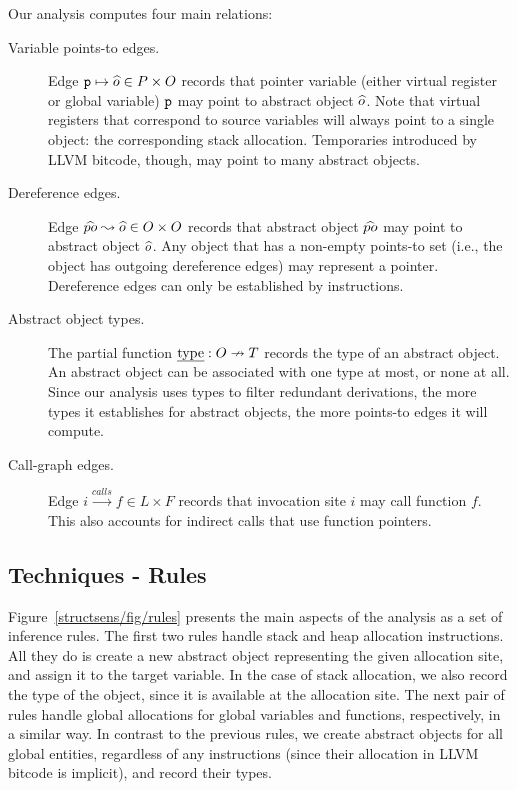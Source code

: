 \vspace{0.5em}
\noindent
Our analysis computes four main
relations:
\begin{description}
\item[Variable points-to edges.] Edge $\texttt{p} \mapsto \widehat{o} \in P \times O$
  records that pointer variable (either virtual register or global
  variable) $\texttt{p}$ may point to abstract object $\widehat{o}$. Note
  that virtual registers that correspond to source variables will
  always point to a single object: the corresponding stack
  allocation. Temporaries introduced by LLVM bitcode, though, may
  point to many abstract objects.
\item[Dereference edges.] Edge $\widehat{po} \leadsto \widehat{o} \in O \times O$
  records that abstract object $\widehat{po}$ may point to abstract
  object $\widehat{o}$. Any object that has a non-empty points-to set
  (i.e., the object has outgoing dereference edges) may represent a
  pointer. Dereference edges can only be established by 
  instructions.
\item[Abstract object types.] The partial function
  $\text{\emph{type}}: O \nrightarrow T$ records the type of an abstract
  object. An abstract object can be associated with one type at most,
  or none at all. Since our analysis uses types to filter redundant
  derivations, the more types it establishes for abstract objects, the
  more points-to edges it will compute.
\item[Call-graph edges.] Edge $i \xrightarrow{calls} f \in L \times F$
  records that invocation site $i$ may call function $f$. This also
  accounts for indirect calls that use function pointers.
\end{description}


\subsection{Techniques - Rules}
\label{structsens/sect/rules}

Figure~\ref{structsens/fig/rules} presents the main aspects of the
analysis as a set of inference rules. The first two rules handle stack
and heap allocation instructions. All they do is create a new abstract
object representing the given allocation site, and assign it to the
target variable. In the case of stack allocation, we also record the
type of the object, since it is available at the allocation site. The
next pair of rules handle global allocations for global variables and
functions, respectively, in a similar way. In contrast to the previous
rules, we create abstract objects for all global entities, regardless
of any instructions (since their allocation in LLVM bitcode is
implicit), and record their types.

